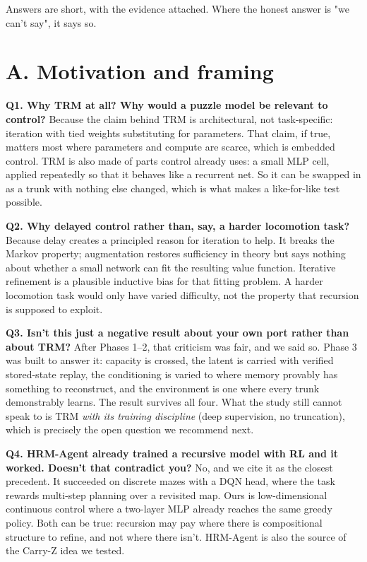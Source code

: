 \documentclass[11pt]{article}
\begin{document}
Answers are short, with the evidence attached. Where the honest answer is "we can't say", it says so.



\section*{A. Motivation and framing}



\textbf{Q1. Why TRM at all? Why would a puzzle model be relevant to control?} Because the claim behind TRM is architectural, not task-specific: iteration with tied weights substituting for parameters. That claim, if true, matters most where parameters and compute are scarce, which is embedded control. TRM is also made of parts control already uses: a small MLP cell, applied repeatedly so that it behaves like a recurrent net. So it can be swapped in as a trunk with nothing else changed, which is what makes a like-for-like test possible.



\textbf{Q2. Why delayed control rather than, say, a harder locomotion task?} Because delay creates a principled reason for iteration to help. It breaks the Markov property; augmentation restores sufficiency in theory but says nothing about whether a small network can fit the resulting value function. Iterative refinement is a plausible inductive bias for that fitting problem. A harder locomotion task would only have varied difficulty, not the property that recursion is supposed to exploit.



\textbf{Q3. Isn't this just a negative result about your own port rather than about TRM?} After Phases 1--2, that criticism was fair, and we said so. Phase 3 was built to answer it: capacity is crossed, the latent is carried with verified stored-state replay, the conditioning is varied to where memory provably has something to reconstruct, and the environment is one where every trunk demonstrably learns. The result survives all four. What the study still cannot speak to is TRM \emph{with its training discipline} (deep supervision, no truncation), which is precisely the open question we recommend next.



\textbf{Q4. HRM-Agent already trained a recursive model with RL and it worked. Doesn't that contradict you?} No, and we cite it as the closest precedent. It succeeded on discrete mazes with a DQN head, where the task rewards multi-step planning over a revisited map. Ours is low-dimensional continuous control where a two-layer MLP already reaches the same greedy policy. Both can be true: recursion may pay where there is compositional structure to refine, and not where there isn't. HRM-Agent is also the source of the Carry-Z idea we tested.
\end{document}
